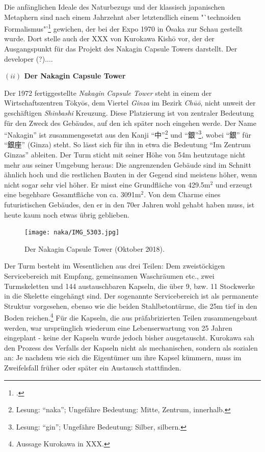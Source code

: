 \documentclass[a4paper, 12pt]{article}
\begin{document}
\begin{onehalfspace}
Die anfänglichen Ideale des Naturbezugs und der klassisch japanischen Metaphern sind nach einem Jahrzehnt aber letztendlich einem "`technoiden Formalismus"’\footnote{\Cite[Siehe][S. 246]{gleiter}.} gewichen, der bei der Expo 1970 in Ôsaka zur Schau gestellt wurde. Dort stelle auch der XXX von Kurokawa Kishō vor, der der Ausgangspunkt für das Projekt des Nakagin Capsule Towers darstellt. Der developer (?).... 




\vspace{5mm}
\noindent\textbf{$(ii)$ Der Nakagin Capsule Tower}

\noindent Der 1972 fertiggestellte \emph{Nakagin Capsule Tower} steht in einem der Wirtschaftszentren Tōkyōs, dem Viertel \emph{Ginza} im Bezirk \emph{Chūō}, nicht unweit der geschäftigen \emph{Shinbashi} Kreuzung. Diese Platzierung ist von zentraler Bedeutung für den Zweck des Gebäudes, auf den ich später noch eingehen werde. Der Name "`Nakagin"' ist zusammengesetzt aus den Kanji "`中"'\footnote{Lesung: "`naka"'; Ungefähre Bedeutung: Mitte, Zentrum, innerhalb.} und "`銀"'\footnote{Lesung: "`gin"'; Ungefähre Bedeutung: Silber, silbern.}, wobei "`銀"' für "`銀座"' (Ginza) steht. So lässt sich für ihn in etwa die Bedeutung "`Im Zentrum Ginzas"' ableiten. Der Turm sticht mit seiner Höhe von 54m heutzutage nicht mehr aus seiner Umgebung heraus: Die angrenzenden Gebäude sind im Schnitt ähnlich hoch und die restlichen Bauten in der Gegend sind meistens höher, wenn nicht sogar sehr viel höher. Er misst eine Grundfläche von 429.5m$^2$ und erzeugt eine begehbare Gesamtfläche von ca. 3091m$^2$. Von dem Charme eines futuristischen Gebäudes, den er in den 70er Jahren wohl gehabt haben muss, ist heute kaum noch etwas übrig geblieben. 


\begin{figure}[h]
    \centering
    \texttt{[image: naka/IMG\_5303.jpg]}
    \caption{Der Nakagin Capsule Tower (Oktober 2018).}
    \label{fig:tawa}
\end{figure}

Der Turm besteht im Wesentlichen aus drei Teilen: Dem zweistöckigen Servicebereich mit Empfang, gemeinsamen Waschräumen etc., zwei Turmskeletten und 144 austauschbaren Kapseln, die über 9, bzw. 11 Stockwerke in die Skelette eingehängt sind. Der sogenannte Servicebereich ist als permanente Struktur vorgesehen, ebenso wie die beiden Stahlbetontürme, die 25m tief in den Boden reichen.\footnote{Aussage Kurokawa in XXX.} Für die Kapseln, die aus präfabrizierten Teilen zusammengebaut werden, war ursprünglich wiederum eine Lebenserwartung von 25 Jahren eingeplant - keine der Kapseln wurde jedoch bisher ausgetauscht. Kurokawa sah den Prozess des Verfalls der Kapseln nicht als mechanischen, sondern als sozialen an: Je nachdem wie sich die Eigentümer um ihre Kapsel kümmern, muss im Zweifelsfall früher oder später ein Austausch stattfinden. 


\end{onehalfspace}
\end{document}
